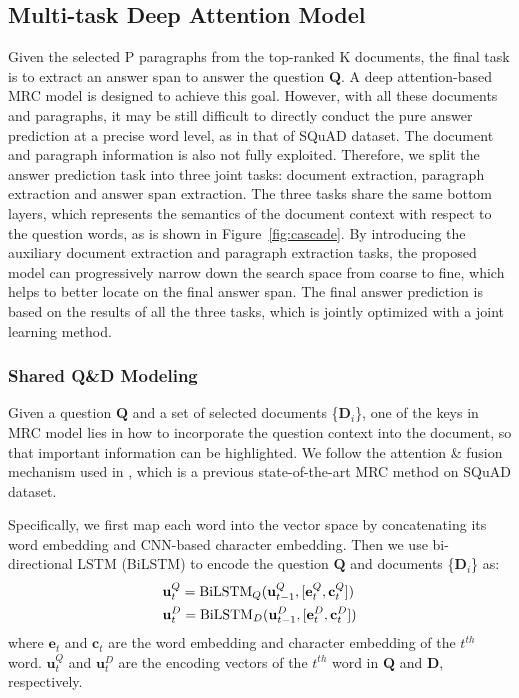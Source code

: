 \documentclass[letterpaper]{article} \usepackage{aaai19}  \usepackage{graphicx}
\begin{document}
\subsection{Multi-task Deep Attention Model}
Given the selected P paragraphs from the top-ranked K documents, the final task is to extract an answer span to answer the question $\textbf{Q}$. A deep attention-based MRC model is designed to achieve this goal. However, with all these documents and paragraphs, it may be still difficult to directly conduct the pure answer prediction at a precise word level, as in that of SQuAD dataset. The document and paragraph information is also not fully exploited. Therefore, we split the answer prediction task into three joint tasks: document extraction, paragraph extraction and answer span extraction. The three tasks share the same bottom layers, which represents the semantics of the document context with respect to the question words, as is shown in Figure~\ref{fig:cascade}. By introducing the auxiliary document extraction and paragraph extraction tasks, the proposed model can progressively narrow down the search space from coarse to fine, which helps to better locate on the final answer span. The final answer prediction is based on the results of all the three tasks, which is jointly optimized with a joint learning method. 

\subsubsection{Shared Q\&D Modeling}
Given a question $\textbf{Q}$ and a set of selected documents \{$\textbf{D}_i$\}, one of the keys in MRC model lies in how to incorporate the question context into the document, so that important information can be highlighted. We follow the attention \& fusion mechanism used in \cite{wang2018alibaba}, which is a previous state-of-the-art MRC method on SQuAD dataset.  

Specifically, we first map each word into the vector space by concatenating its word embedding and CNN-based character embedding. Then we use bi-directional LSTM (BiLSTM) to encode the question $\textbf{Q}$ and documents \{$\textbf{D}_i$\} as:
\begin{equation}\label{equ:2}
\begin{split}
&\textbf{u}_t^Q =  {\rm BiLSTM}_{Q}(\textbf{u}_{t-1}^Q, [\textbf{e}_t^Q,\textbf{c}_t^Q])  \\
&\textbf{u}_t^D =  {\rm BiLSTM}_{D}(\textbf{u}_{t-1}^D, [\textbf{e}_t^D,\textbf{c}_t^D])
\end{split}
\end{equation}
where $\textbf{e}_t$ and $\textbf{c}_t$ are the word embedding and character embedding of the $t^{th}$ word. $\textbf{u}_t^Q$ and $\textbf{u}_t^D$ are the encoding vectors of the $t^{th}$ word in $\textbf{Q}$ and $\textbf{D}$, respectively.
\end{document}
